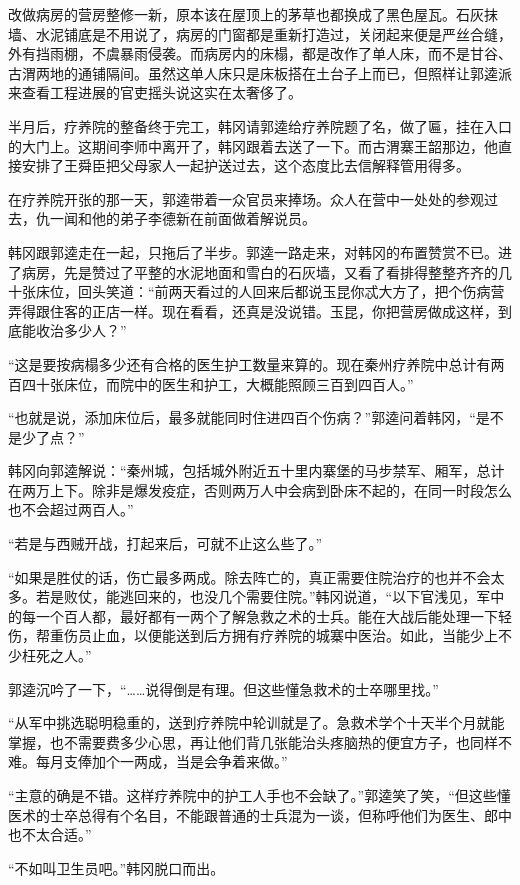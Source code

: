 改做病房的营房整修一新，原本该在屋顶上的茅草也都换成了黑色屋瓦。石灰抹墙、水泥铺底是不用说了，病房的门窗都是重新打造过，关闭起来便是严丝合缝，外有挡雨棚，不虞暴雨侵袭。而病房内的床榻，都是改作了单人床，而不是甘谷、古渭两地的通铺隔间。虽然这单人床只是床板搭在土台子上而已，但照样让郭逵派来查看工程进展的官吏摇头说这实在太奢侈了。

半月后，疗养院的整备终于完工，韩冈请郭逵给疗养院题了名，做了匾，挂在入口的大门上。这期间李师中离开了，韩冈跟着去送了一下。而古渭寨王韶那边，他直接安排了王舜臣把父母家人一起护送过去，这个态度比去信解释管用得多。

在疗养院开张的那一天，郭逵带着一众官员来捧场。众人在营中一处处的参观过去，仇一闻和他的弟子李德新在前面做着解说员。

韩冈跟郭逵走在一起，只拖后了半步。郭逵一路走来，对韩冈的布置赞赏不已。进了病房，先是赞过了平整的水泥地面和雪白的石灰墙，又看了看排得整整齐齐的几十张床位，回头笑道：“前两天看过的人回来后都说玉昆你忒大方了，把个伤病营弄得跟住客的正店一样。现在看看，还真是没说错。玉昆，你把营房做成这样，到底能收治多少人？”

“这是要按病榻多少还有合格的医生护工数量来算的。现在秦州疗养院中总计有两百四十张床位，而院中的医生和护工，大概能照顾三百到四百人。”

“也就是说，添加床位后，最多就能同时住进四百个伤病？”郭逵问着韩冈，“是不是少了点？”

韩冈向郭逵解说：“秦州城，包括城外附近五十里内寨堡的马步禁军、厢军，总计在两万上下。除非是爆发疫症，否则两万人中会病到卧床不起的，在同一时段怎么也不会超过两百人。”

“若是与西贼开战，打起来后，可就不止这么些了。”

“如果是胜仗的话，伤亡最多两成。除去阵亡的，真正需要住院治疗的也并不会太多。若是败仗，能逃回来的，也没几个需要住院。”韩冈说道，“以下官浅见，军中的每一个百人都，最好都有一两个了解急救之术的士兵。能在大战后能处理一下轻伤，帮重伤员止血，以便能送到后方拥有疗养院的城寨中医治。如此，当能少上不少枉死之人。”

郭逵沉吟了一下，“……说得倒是有理。但这些懂急救术的士卒哪里找。”

“从军中挑选聪明稳重的，送到疗养院中轮训就是了。急救术学个十天半个月就能掌握，也不需要费多少心思，再让他们背几张能治头疼脑热的便宜方子，也同样不难。每月支俸加个一两成，当是会争着来做。”

“主意的确是不错。这样疗养院中的护工人手也不会缺了。”郭逵笑了笑，“但这些懂医术的士卒总得有个名目，不能跟普通的士兵混为一谈，但称呼他们为医生、郎中也不太合适。”

“不如叫卫生员吧。”韩冈脱口而出。

